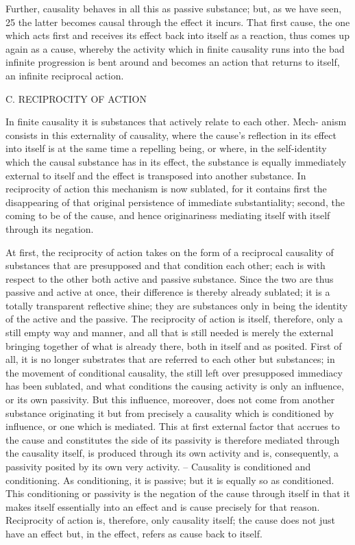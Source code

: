 Further, causality behaves in all this as passive substance; but, as we
have seen, 25 the latter becomes causal through the effect it incurs. That first
cause, the one which acts first and receives its effect back into itself as a
reaction, thus comes up again as a cause, whereby the activity which in
finite causality runs into the bad infinite progression is bent around and
becomes an action that returns to itself, an infinite reciprocal action.

C. RECIPROCITY OF ACTION

In finite causality it is substances that actively relate to each other. Mech-
anism consists in this externality of causality, where the cause’s reflection
in its effect into itself is at the same time a repelling being, or where, in
the self-identity which the causal substance has in its effect, the substance
is equally immediately external to itself and the effect is transposed into
another substance. In reciprocity of action this mechanism is now sublated,
for it contains first the disappearing of that original persistence of immediate
substantiality; second, the coming to be of the cause, and hence originariness
mediating itself with itself through its negation.

At first, the reciprocity of action takes on the form of a reciprocal causality
of substances that are presupposed and that condition each other; each is with
respect to the other both active and passive substance. Since the two are thus
passive and active at once, their difference is thereby already sublated; it
is a totally transparent reflective shine; they are substances only in being
the identity of the active and the passive. The reciprocity of action is itself,
therefore, only a still empty way and manner, and all that is still needed
is merely the external bringing together of what is already there, both in
itself and as posited. First of all, it is no longer substrates that are referred to
each other but substances; in the movement of conditional causality, the
still left over presupposed immediacy has been sublated, and what conditions
the causing activity is only an influence, or its own passivity. But this
influence, moreover, does not come from another substance originating it
but from precisely a causality which is conditioned by influence, or one
which is mediated. This at first external factor that accrues to the cause
and constitutes the side of its passivity is therefore mediated through the
causality itself, is produced through its own activity and is, consequently,
a passivity posited by its own very activity. – Causality is conditioned and
conditioning. As conditioning, it is passive; but it is equally so as conditioned.
This conditioning or passivity is the negation of the cause through itself in
that it makes itself essentially into an effect and is cause precisely for that
reason. Reciprocity of action is, therefore, only causality itself; the cause does
not just have an effect but, in the effect, refers as cause back to itself.

